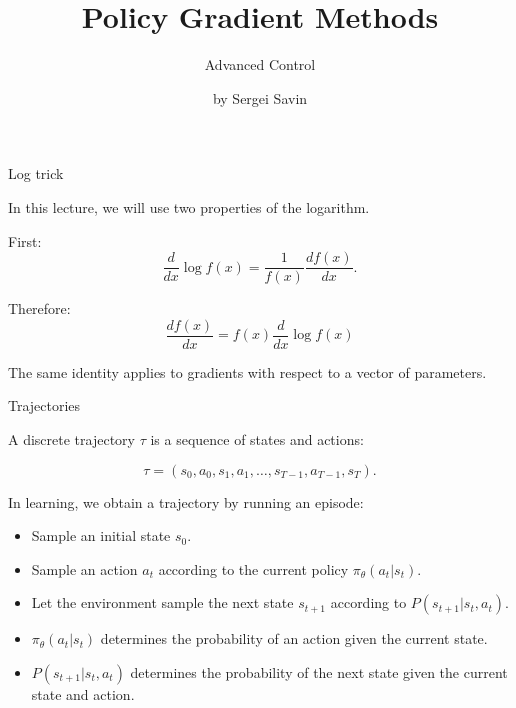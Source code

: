 \documentclass{beamer}
\subtitle{Advanced Control}
\author{by Sergei Savin}
\date{\mydate}
\title{Policy Gradient Methods}
\begin{document}
\maketitle




\begin{frame}{Log trick}
	\begin{flushleft}
		
		In this lecture, we will use two properties of the logarithm.
		
		First:
		\[
		\frac{d}{dx}\log f(x)
		=
		\frac{1}{f(x)}\frac{df(x)}{dx}.
		\]
		
		Therefore:
		\[
		\boxed{
			\frac{df(x)}{dx}
			=
			f(x)\frac{d}{dx}\log f(x)
		}
		\]
		
		The same identity applies to gradients with respect to
		a vector of parameters.
		
	\end{flushleft}
\end{frame}


\begin{frame}{Trajectories}
	\begin{flushleft}
		
		A discrete trajectory $\tau$ is a sequence of states
		and actions:
		
		\[
		\tau=(s_0,a_0,s_1,a_1,\ldots,s_{T-1},a_{T-1},s_T).
		\]
		
		In learning, we obtain a trajectory by running an episode:
		
		\begin{itemize}
			\item Sample an initial state $s_0$.
			\item Sample an action $a_t$ according to
			the current policy $\pi_\theta(a_t|s_t)$.
			\item Let the environment sample the next state
			$s_{t+1}$ according to
			$P(s_{t+1}|s_t,a_t)$.
		\end{itemize}
		
		\vspace{0.2cm}
		
		\begin{itemize}
			\item $\pi_\theta(a_t|s_t)$ determines the probability
			of an action given the current state.
			\item $P(s_{t+1}|s_t,a_t)$ determines the probability
			of the next state given the current state and action.
		\end{itemize}
		
	\end{flushleft}
\end{frame}
\end{document}

